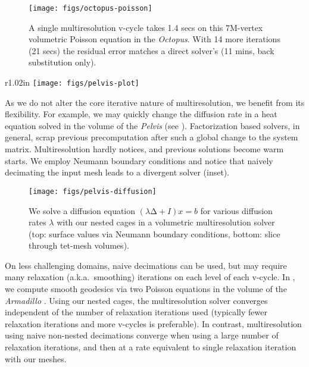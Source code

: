 \begin{figure}
  \texttt{[image: figs/octopus-poisson]}
  \caption{A single multiresolution v-cycle takes 1.4 secs on this 7M-vertex
  volumetric Poisson equation in the \emph{Octopus}. With 14 more iterations
  (21 secs) the residual error matches a direct solver's (11 mins, back
  substitution only).}
  \label{fig:octopus-poisson}
\end{figure}

\begin{wrapfigure}{r}{1.02in}
%
\centering
%
\texttt{[image: figs/pelvis-plot]}
%
\end{wrapfigure}
%
As we do not alter the core iterative nature of multiresolution, we benefit
from its flexibility. For example, we may quickly change the diffusion rate in
a heat equation solved in the volume of the \emph{Pelvis} (see
). 
%
Factorization based solvers, in general, scrap previous precomputation after
such a global change to the system matrix. 
%
Multiresolution hardly notices, and previous solutions become warm starts.
%
We employ Neumann boundary conditions and notice that naively decimating the
input mesh leads to a divergent solver (inset).
%
%

\begin{figure}
  \texttt{[image: figs/pelvis-diffusion]}
  \caption{We solve a diffusion equation $(λ∆+I) x = b$ for various diffusion
  rates $λ$ with our nested cages in a volumetric multiresolution solver (top:
  surface values via Neumann boundary conditions, bottom: slice through
  tet-mesh volumes).}
  \label{fig:pelvis-diffusion}
\end{figure}

On less challenging domains, naive decimations can be used, but may require
many relaxation (a.k.a.\ smoothing) iterations on each level of each v-cycle.
%
In , we compute smooth geodesics via two Poisson
equations in the volume of the \emph{Armadillo} \cite{Crane:2013:RFV}.
%
Using our nested cages, the multiresolution solver converges independent of the
number of relaxation iterations used (typically fewer relaxation iterations and
more v-cycles is preferable).
%
In contrast, multiresolution using naive non-nested decimations converge when
using a large number of relaxation iterations, and then at a rate equivalent to
single relaxation iteration with our meshes.

